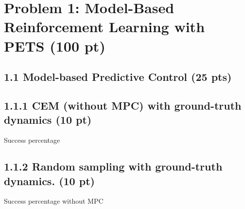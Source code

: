 \documentclass[12pt]{article}
\begin{document}

\newpage
\section*{Problem 1: Model-Based Reinforcement Learning with PETS (100 pt)}
\subsection*{1.1 Model-based Predictive Control (25 pts)}

\subsection*{1.1.1 CEM (without MPC) with ground-truth dynamics (10 pt)}

Success percentage
\begin{tcolorbox}[fit,height=1cm, width=5cm, blank, borderline={1pt}{1pt},nobeforeafter]
\begin{center}
\end{center}
\end{tcolorbox}

\subsection*{1.1.2 Random sampling with ground-truth dynamics. (10 pt)}

Success percentage without MPC 
\begin{tcolorbox}[fit,height=1cm, width=5cm, blank, borderline={1pt}{1pt},nobeforeafter]
\begin{center}
\end{center}
\end{tcolorbox}
\end{document}
